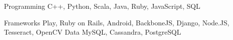 

\begin{cvskills}

  \cvskill
    {Programming} %
    {C++, Python, Scala, Java, Ruby, JavaScript, SQL} %


  \cvskill
  {Frameworks} %
    {Play, Ruby on Rails, Android, BackboneJS, Django, Node.JS, Tesseract, OpenCV } %
  \cvskill
  {Data} %
    {MySQL, Cassandra, PostgreSQL} %
\end{cvskills}
